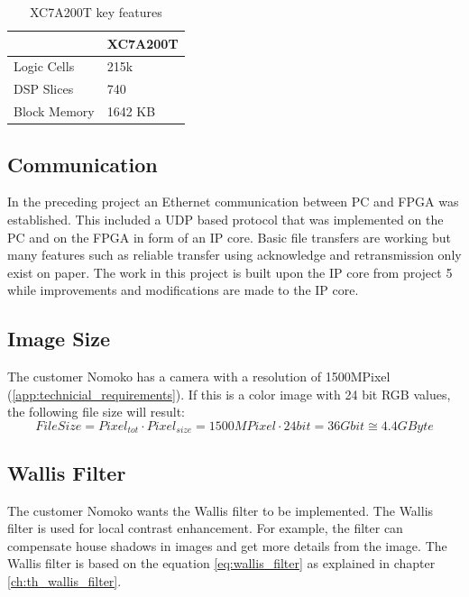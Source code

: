 \begin{table}[tb!]
    \centering
    \begin{tabular}{l l}
        \toprule
         & XC7A200T \\
        \midrule
        Logic Cells & 215k \\
        DSP Slices & 740 \\
        Block Memory & 1642 KB \\
        \bottomrule
    \end{tabular}
    \caption{XC7A200T key features \cite{xilinx_ac701}}
    \label{tab:XC7A200T}
\end{table}


\subsection{Communication} \label{chapt:mission:communication} 
In the preceding project \cite{p5report} an Ethernet communication between PC and
FPGA was established. This included a UDP based protocol that was implemented on
the PC and on the FPGA in form of an IP core. Basic file transfers are working
but many features such as reliable transfer using acknowledge and retransmission
only exist on paper. The work in this project is built
upon the IP core from project 5 while improvements and modifications are made to
the IP core.

\subsection{Image Size}
The customer Nomoko has a camera with a resolution of 1500MPixel (\ref{app:technicial_requirements}). If this is a color image with 24 bit RGB values, the following file size will result:
\begin{equation}
    File Size = Pixel_{tot} \cdot Pixel_{size} = 1500MPixel \cdot 24bit = 36Gbit \cong 4.4GByte
    \label{eq:filesize}
\end{equation}

\subsection{Wallis Filter} \label{chapt:mission:wallis}
The customer Nomoko wants the Wallis filter to be implemented. The Wallis
filter is used for local contrast enhancement. For example, the filter can compensate house shadows in images and get more details from the image. 
The Wallis filter is based on the equation \ref{eq:wallis_filter} as explained in chapter \ref{ch:th_wallis_filter}.


